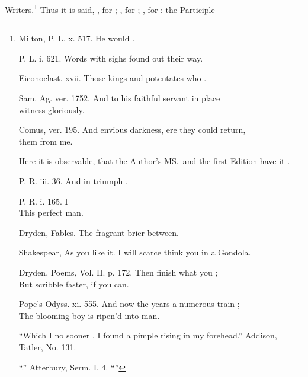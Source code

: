 Writers.\footnote{
  \begin{aquote}{Milton, P. L. x. 517.}
    He would .
  \end{aquote}

  \begin{aquote}{P. L. i. 621.}
    Words  with sighs found out their way.
  \end{aquote}

  \begin{aquote}{Eiconoclast. xvii.}
    Those kings and potentates who .
  \end{aquote}

  \begin{aquote}{Sam. Ag. ver. 1752.}
    And to his faithful servant  in place\\
     witness gloriously.
  \end{aquote}

  \begin{aquote}{Comus, ver. 195.}
    And envious darkness, ere they could return,\\
     them from me.
  \end{aquote}

  Here it is observable, that the Author's MS.\ and the first Edition
  have it .

  \begin{aquote}{P. R. iii. 36.}
    And in triumph .
  \end{aquote}

  \begin{aquote}{P. R. i. 165.}
    I \\
    This perfect man.
  \end{aquote}

  \begin{aquote}{Dryden, Fables.}
    The fragrant brier  between.
  \end{aquote}

  \begin{aquote}{Shakespear, As you like it.}
    I will scarce think you  in a Gondola.
  \end{aquote}

  \begin{aquote}{Dryden, Poems, Vol. II. p. 172.}
    Then finish what you ;\\
    But scribble faster, if you can.
  \end{aquote}

  \begin{aquote}{Pope's Odyss. xi. 555.}
    And now the years a numerous train ;\\
    The blooming boy is ripen'd into man.
  \end{aquote}

  ``Which I  no sooner ,  I found a pimple
  rising in my forehead.'' Addison, Tatler, No. 131.

  ``.'' Atterbury, Serm. I. 4. ``''} Thus
it is said, , for ; , for ; , for : the Participle

